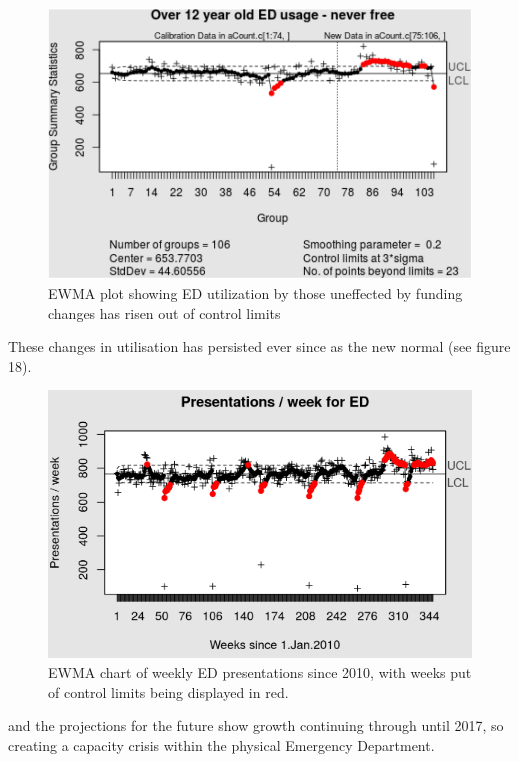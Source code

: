 \documentclass[11pt,a4paper]{article}
\begin{document}
\begin{figure}[htp]
\centering
\includegraphics[scale=0.50]{Over12.png}
\caption{EWMA plot showing ED utilization by those uneffected by funding changes has risen out of control limits}
\label{Rise in ED utilisation by over 12 year olds}
\end{figure}

These changes in utilisation has persisted ever since as the new normal (see figure 18).\\

\begin{figure}[htp]
\centering
\includegraphics[scale=0.70]{EWMA_ED_pesentations.png}
\caption{EWMA chart of weekly ED presentations since 2010, with weeks put of control limits being displayed in red.}
\label{EWMA statistical process chart of ED presentations}
\end{figure}

and the projections for the future show growth continuing through until 2017, so creating a capacity crisis within the physical Emergency Department.\\
\end{document}
